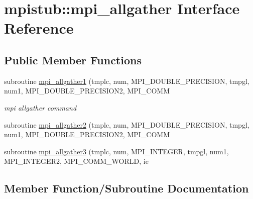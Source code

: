 \hypertarget{interfacempistub_1_1mpi__allgather}{}\section{mpistub\+::mpi\+\_\+allgather Interface Reference}
\label{interfacempistub_1_1mpi__allgather}
\subsection*{Public Member Functions}
\begin{DoxyCompactItemize}
\item 
subroutine \mbox{\hyperlink{interfacempistub_1_1mpi__allgather_ad6c61db436acd66002520ad122c4595e}{mpi\+\_\+allgather1}} (tmplc, num, M\+P\+I\+\_\+\+D\+O\+U\+B\+L\+E\+\_\+\+P\+R\+E\+C\+I\+S\+I\+ON, tmpgl, num1, M\+P\+I\+\_\+\+D\+O\+U\+B\+L\+E\+\_\+\+P\+R\+E\+C\+I\+S\+I\+O\+N2, M\+P\+I\+\_\+\+C\+O\+MM
\begin{DoxyCompactList}\small\item\em mpi allgather command \end{DoxyCompactList}\item 
subroutine \mbox{\hyperlink{interfacempistub_1_1mpi__allgather_ad38aaf8f5bb58287ef5c3c0327b9dcd0}{mpi\+\_\+allgather2}} (tmplc, num, M\+P\+I\+\_\+\+D\+O\+U\+B\+L\+E\+\_\+\+P\+R\+E\+C\+I\+S\+I\+ON, tmpgl, num1, M\+P\+I\+\_\+\+D\+O\+U\+B\+L\+E\+\_\+\+P\+R\+E\+C\+I\+S\+I\+O\+N2, M\+P\+I\+\_\+\+C\+O\+MM
\item 
subroutine \mbox{\hyperlink{interfacempistub_1_1mpi__allgather_a32287150b908808c61f3acb19402c6c8}{mpi\+\_\+allgather3}} (tmplc, num, M\+P\+I\+\_\+\+I\+N\+T\+E\+G\+ER, tmpgl, num1, M\+P\+I\+\_\+\+I\+N\+T\+E\+G\+E\+R2, M\+P\+I\+\_\+\+C\+O\+M\+M\+\_\+\+W\+O\+R\+LD, ie
\end{DoxyCompactItemize}


\subsection{Member Function/\+Subroutine Documentation}
\mbox{\label{interfacempistub_1_1mpi__allgather_ad6c61db436acd66002520ad122c4595e}} 
